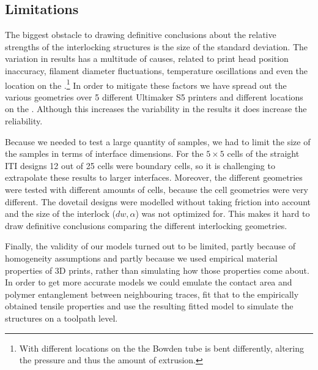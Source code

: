 \subsection{Limitations}
The biggest obstacle to drawing definitive conclusions about the relative strengths of the interlocking structures is the size of the standard deviation.
The variation in results has a multitude of causes, related to print head position inaccuracy, filament diameter fluctuations, temperature oscillations and even the location on the .\footnote{With different locations on the  the Bowden tube is bent differently, altering the pressure and thus the amount of extrusion.}
In order to mitigate these factors we have spread out the various geometries over 5 different Ultimaker S5 printers and different locations on the .
Although this increases the variability in the results it does increase the reliability.

Because we needed to test a large quantity of samples, we had to limit the size of the samples in terms of interface dimensions.
For the $5\times5$ cells of the straight ITI designs 12 out of 25 cells were boundary cells, so it is challenging to extrapolate these results to larger interfaces.
Moreover, the different geometries were tested with different amounts of cells, because the cell geometries were very different.
The dovetail designs were modelled without taking friction into account and the size of the interlock ($dw, \alpha$) was not optimized for.
This makes it hard to draw definitive conclusions comparing the different interlocking geometries.

Finally, the validity of our models turned out to be limited,
partly because of homogeneity assumptions and partly because we used empirical material properties of 3D prints, rather than simulating how those properties come about.
In order to get more accurate models we could emulate the contact area and polymer entanglement between neighbouring traces,
fit that to the empirically obtained tensile properties and use the resulting fitted model to simulate the structures on a toolpath level.
